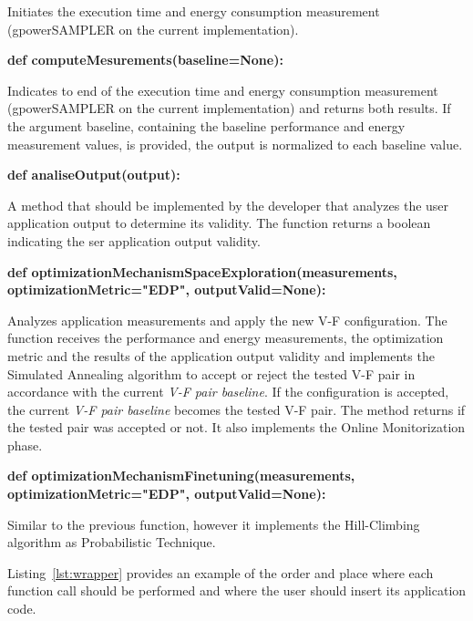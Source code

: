 Initiates the execution time and energy consumption measurement (gpowerSAMPLER on the current implementation).

\textbf{def computeMesurements(baseline=None):}

Indicates to end of the execution time and energy consumption measurement (gpowerSAMPLER on the current implementation) and returns both results. If the argument baseline, containing the baseline performance and energy measurement values, is provided, the output is normalized to each baseline value.


\textbf{def analiseOutput(output):}

A method that should be implemented by the developer that analyzes the user application output to determine its validity. The function returns a boolean indicating the ser application output validity.
    
\textbf{def optimizationMechanismSpaceExploration(measurements, optimizationMetric="EDP", outputValid=None):}

Analyzes application measurements and apply the new V-F configuration. The function receives the performance and energy measurements, the optimization metric and the results of the application output validity and implements the Simulated Annealing algorithm to accept or reject the tested V-F pair in accordance with the current \textit{V-F pair baseline}. If the configuration is accepted, the current \textit{V-F pair baseline} becomes the tested V-F pair. The method returns if the tested pair was accepted or not. It also implements the Online Monitorization phase.


\textbf{def optimizationMechanismFinetuning(measurements, optimizationMetric="EDP", outputValid=None):}

Similar to the previous function, however it implements the Hill-Climbing algorithm as Probabilistic Technique.


Listing~\ref{lst:wrapper} provides an example of the order and place where each function call should be performed and where the user should insert its application code.



